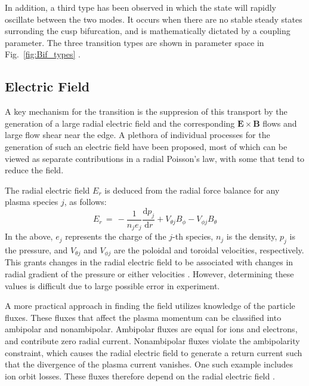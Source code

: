 \documentclass[a4paper]{article}
\begin{document}
In addition, a third type has been observed in which the state will rapidly oscillate between the two modes.
It occurs when there are no stable steady states surronding the cusp bifurcation, and is mathematically dictated by a coupling parameter.
The three transition types are shown in parameter space in Fig.~\ref{fig:Bif_types}
\cite{weymiens_bifurcation_2014}.


\subsection{Electric Field}
A key mechanism for the transition is the suppresion of this transport by the generation of a large radial electric field and the corresponding $\mathbf{E}\times\mathbf{B}$ flows and large flow shear near the edge.
A plethora of individual processes for the generation of such an electric field have been proposed, most of which can be viewed as separate contributions in a radial Poisson's law, with some that tend to reduce the field.

The radial electric field $E_r$ is deduced from the radial force balance for any plasma species $j$, as follows:
\begin{equation}
	E_r \,=\, -\frac{1}{n_j e_j} \frac{\text{d} p_j}{\text{d} r} + V_{\theta j} B_\phi - V_{\phi j} B_\theta
	\label{eq:E_r}
\end{equation}
In the above, $e_j$ represents the charge of the $j$-th species, $n_j$ is the density, $p_j$ is the pressure, and $V_{\theta j}$ and $V_{\phi j}$ are the poloidal and toroidal velocities, respectively.
This grants changes in the radial electric field to be associated with changes in radial gradient of the pressure or either velocities \cite{connor_review_2000}\cite{staps_backstepping_2017}.
However, determining these values is difficult due to large possible error in experiment.

A more practical approach in finding the field utilizes knowledge of the particle fluxes.
These fluxes that affect the plasma momentum can be classified into ambipolar and nonambipolar.
Ambipolar fluxes are equal for ions and electrons, and contribute zero radial current.
Nonambipolar fluxes violate the ambipolarity constraint, which causes the radial electric field to generate a return current such that the divergence of the plasma current vanishes.
One such example includes ion orbit losses.
These fluxes therefore depend on the radial electric field \cite{callen_toroidal_2009}.
\end{document}
